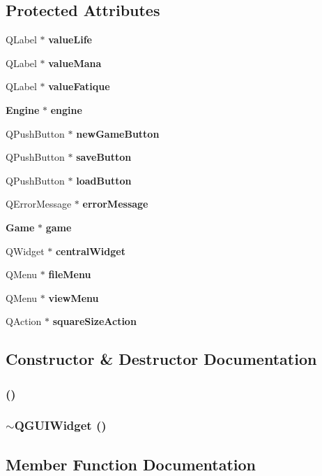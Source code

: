 \subsection*{Protected Attributes}
\begin{CompactItemize}
\item 
QLabel $\ast$ {\bf value\-Life}
\item 
QLabel $\ast$ {\bf value\-Mana}
\item 
QLabel $\ast$ {\bf value\-Fatique}
\item 
{\bf Engine} $\ast$ {\bf engine}
\item 
QPush\-Button $\ast$ {\bf new\-Game\-Button}
\item 
QPush\-Button $\ast$ {\bf save\-Button}
\item 
QPush\-Button $\ast$ {\bf load\-Button}
\item 
QError\-Message $\ast$ {\bf error\-Message}
\item 
{\bf Game} $\ast$ {\bf game}
\item 
QWidget $\ast$ {\bf central\-Widget}
\item 
QMenu $\ast$ {\bf file\-Menu}
\item 
QMenu $\ast$ {\bf view\-Menu}
\item 
QAction $\ast$ {\bf square\-Size\-Action}
\end{CompactItemize}


\subsection{Constructor \& Destructor Documentation}
\subsubsection{ ()}\label{classQGUIWidget_a0}


\subsubsection{\setlength{\rightskip}{0pt plus 5cm}$\sim${\bf QGUIWidget} ()}\label{classQGUIWidget_a1}




\subsection{Member Function Documentation}
